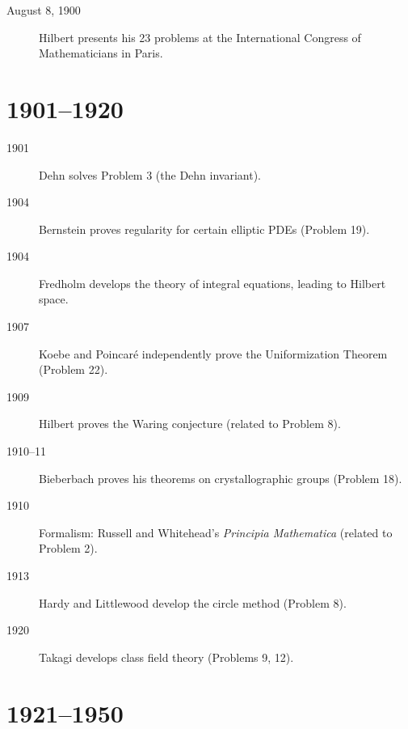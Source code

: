 \begin{description}
    \item[August 8, 1900] Hilbert presents his 23 problems at the International Congress of Mathematicians in Paris.
\end{description}

\section*{1901--1920}

\begin{description}
    \item[1901] Dehn solves Problem 3 (the Dehn invariant).
    \item[1904] Bernstein proves regularity for certain elliptic PDEs (Problem 19).
    \item[1904] Fredholm develops the theory of integral equations, leading to Hilbert space.
    \item[1907] Koebe and Poincar\'e independently prove the Uniformization Theorem (Problem 22).
    \item[1909] Hilbert proves the Waring conjecture (related to Problem 8).
    \item[1910--11] Bieberbach proves his theorems on crystallographic groups (Problem 18).
    \item[1910] Formalism: Russell and Whitehead's \textit{Principia Mathematica} (related to Problem 2).
    \item[1913] Hardy and Littlewood develop the circle method (Problem 8).
    \item[1920] Takagi develops class field theory (Problems 9, 12).
\end{description}

\section*{1921--1950}

